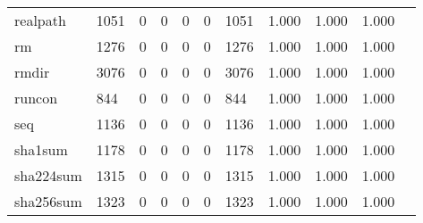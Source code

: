 \begin{longtable}{lp{1.10cm}p{1.10cm}p{1.10cm}p{1.10cm}p{1.10cm}p{1.10cm}p{1.10cm}p{1.10cm}p{1.10cm}p{1.10cm}}
realpath  &                   1051 &                                  0 &                                 0 &                                0 &                                 0 &                            1051 &                             1.000 &                                 1.000 &                               1.000 \\
rm        &                   1276 &                                  0 &                                 0 &                                0 &                                 0 &                            1276 &                             1.000 &                                 1.000 &                               1.000 \\
rmdir     &                   3076 &                                  0 &                                 0 &                                0 &                                 0 &                            3076 &                             1.000 &                                 1.000 &                               1.000 \\
runcon    &                    844 &                                  0 &                                 0 &                                0 &                                 0 &                             844 &                             1.000 &                                 1.000 &                               1.000 \\
seq       &                   1136 &                                  0 &                                 0 &                                0 &                                 0 &                            1136 &                             1.000 &                                 1.000 &                               1.000 \\
sha1sum   &                   1178 &                                  0 &                                 0 &                                0 &                                 0 &                            1178 &                             1.000 &                                 1.000 &                               1.000 \\
sha224sum &                   1315 &                                  0 &                                 0 &                                0 &                                 0 &                            1315 &                             1.000 &                                 1.000 &                               1.000 \\
sha256sum &                   1323 &                                  0 &                                 0 &                                0 &                                 0 &                            1323 &                             1.000 &                                 1.000 &                               1.000 \\

\end{longtable}
